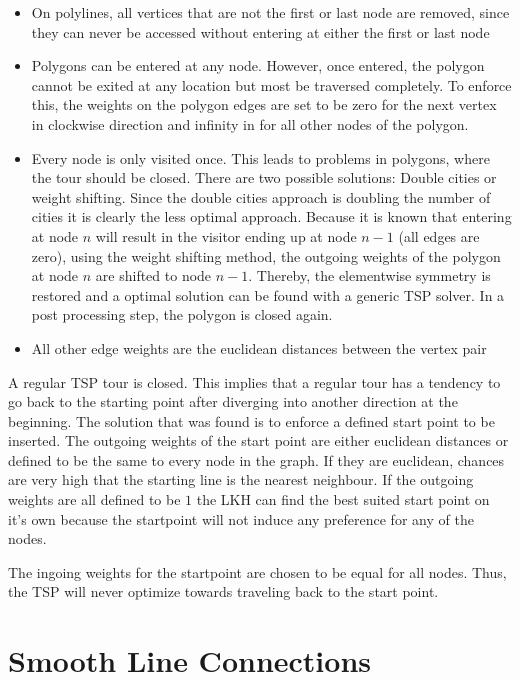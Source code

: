 \documentclass[10pt,twoside,a4paper]{report}
\begin{document}
\begin{itemize}
\item On polylines, all vertices that are not the first or last node are removed, since they can never be accessed without entering at either the first or last node 
\item Polygons can be entered at any node. However, once entered, the polygon cannot be exited at any location but most be traversed completely. To enforce this, the weights on the polygon edges are set to be zero for the next vertex in clockwise direction and infinity in for all other nodes of the polygon.
\item Every node is only visited once. This leads to problems in polygons, where the tour should be closed. There are two possible solutions: Double cities or weight shifting. Since the double cities approach is doubling the number of cities it is clearly the less optimal approach. Because it is known that entering at node $n$ will result in the visitor ending up at node $n-1$ (all edges are zero), using the weight shifting method, the outgoing weights of the polygon at node $n$ are shifted to node $n-1$. Thereby, the elementwise symmetry is restored and a optimal solution can be found with a generic TSP solver. In a post processing step, the polygon is closed again.
\item All other edge weights are the euclidean distances between the vertex pair
\end{itemize}

A regular TSP tour is closed. This implies that a regular tour has a tendency to go back to the starting point after diverging into another direction at the beginning. The solution that was found is to enforce a defined start point to be inserted. The outgoing weights of the start point are either euclidean distances or defined to be the same to every node in the graph. If they are euclidean, chances are very high that the starting line is the nearest neighbour. If the outgoing weights are all defined to be $1$ the LKH can find the best suited start point on it's own because the startpoint will not induce any preference for any of the nodes.

The ingoing weights for the startpoint are chosen to be equal for all nodes. Thus, the TSP will never optimize towards traveling back to the start point.

\section{Smooth Line Connections}
\end{document}
